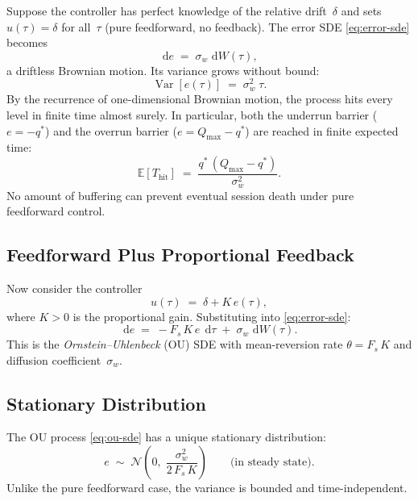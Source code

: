 \documentclass[11pt, a4paper]{article}
\theoremstyle{definition}
\theoremstyle{plain}
\theoremstyle{remark}
\newcommand{\E}{\mathbb{E}}
\newcommand{\Var}{\operatorname{Var}}
\newcommand{\dd}{\,\mathrm{d}}                   %
\begin{document}
Suppose the controller has perfect knowledge of the relative
drift~$\delta$ and sets $u(\tau) = \delta$ for all~$\tau$ (pure
feedforward, no feedback).  The error SDE
\eqref{eq:error-sde} becomes
\begin{equation}\label{eq:ff-sde}
  \dd e \;=\; \sigma_w\,\dd W(\tau),
\end{equation}
a driftless Brownian motion.  Its variance grows without bound:
\begin{equation}\label{eq:ff-var}
  \Var[e(\tau)] \;=\; \sigma_w^2\;\tau.
\end{equation}
By the recurrence of one-dimensional Brownian motion, the process
hits every level in finite time almost surely.  In particular,
both the underrun barrier ($e = -q^*$) and the overrun barrier
($e = Q_{\max} - q^*$) are reached in finite expected time:
\begin{equation}\label{eq:ff-hitting}
  \E[T_{\text{hit}}] \;=\; \frac{q^*\,(Q_{\max} - q^*)}{\sigma_w^2}.
\end{equation}
No amount of buffering can prevent eventual session death under
pure feedforward control.

\subsection{Feedforward Plus Proportional Feedback}\label{sec:ff-prop}

Now consider the controller
\begin{equation}\label{eq:prop-controller}
  u(\tau) \;=\; \delta + K\,e(\tau),
\end{equation}
where $K > 0$ is the proportional gain.  Substituting into
\eqref{eq:error-sde}:
\begin{equation}\label{eq:ou-sde}
  \dd e \;=\; -F_s\,K\,e\;\dd\tau \;+\; \sigma_w\,\dd W(\tau).
\end{equation}
This is the \emph{Ornstein--Uhlenbeck} (OU) SDE with
mean-reversion rate $\theta = F_s\,K$ and diffusion
coefficient~$\sigma_w$.

\subsection{Stationary Distribution}\label{sec:ou-stationary}

The OU process \eqref{eq:ou-sde} has a unique stationary
distribution:
\begin{equation}\label{eq:ou-stat}
  e \;\sim\; \mathcal{N}\!\left(0,\;\frac{\sigma_w^2}{2\,F_s\,K}\right)
  \qquad\text{(in steady state)}.
\end{equation}
Unlike the pure feedforward case, the variance is bounded and
time-independent.
\end{document}
